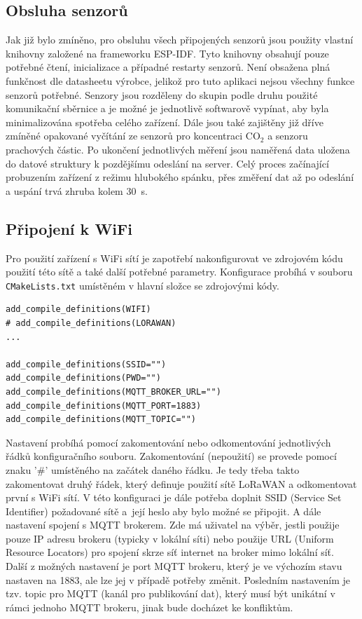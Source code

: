 \subsection{Obsluha senzorů}

Jak již bylo zmíněno, pro obsluhu všech připojených senzorů jsou použity vlastní knihovny založené na frameworku ESP-IDF. Tyto knihovny obsahují pouze potřebné čtení, inicializace a případné restarty senzorů. Není obsažena plná funkčnost dle datasheetu výrobce, jelikož pro tuto aplikaci nejsou všechny funkce senzorů potřebné. Senzory jsou rozděleny do skupin podle druhu použité komunikační sběrnice a je možné je jednotlivě softwarově vypínat, aby byla minimalizována spotřeba celého zařízení. Dále jsou také zajištěny již dříve zmíněné opakované vyčítání ze senzorů pro koncentraci CO$_2$ a senzoru prachových částic. Po ukončení jednotlivých měření jsou naměřená data uložena do datové struktury k pozdějšímu odeslání na server. Celý proces začínající probuzením zařízení z režimu hlubokého spánku, přes změření dat až po odeslání a uspání trvá zhruba kolem \SI{30}{\second}.

\subsection{Připojení k WiFi}

Pro použití zařízení s WiFi sítí je zapotřebí nakonfigurovat ve zdrojovém kódu použití této sítě a také další potřebné parametry. Konfigurace probíhá v souboru \texttt{CMakeLists.txt} umístěném v hlavní složce se zdrojovými kódy.

\begin{lstlisting}[caption={Nastavení spojení pomocí WiFi}]
add_compile_definitions(WIFI)
# add_compile_definitions(LORAWAN)
...

add_compile_definitions(SSID="")
add_compile_definitions(PWD="")
add_compile_definitions(MQTT_BROKER_URL="")
add_compile_definitions(MQTT_PORT=1883)
add_compile_definitions(MQTT_TOPIC="")
\end{lstlisting}

Nastavení probíhá pomocí zakomentování nebo odkomentování jednotlivých řádků konfiguračního souboru. Zakomentování (nepoužití) se provede pomocí znaku '\#' umístěného na začátek daného řádku. Je tedy třeba takto zakomentovat druhý řádek, který definuje použití sítě LoRaWAN a odkomentovat první s WiFi sítí.
V této konfiguraci je dále potřeba doplnit SSID (Service Set Identifier) požadované sítě a~její heslo aby bylo možné se připojit. A dále nastavení spojení s MQTT brokerem. Zde má uživatel na výběr, jestli použije pouze IP adresu brokeru (typicky v lokální síti) nebo použije URL (Uniform Resource Locators) pro spojení skrze síť internet na broker mimo lokální síť. Další z možných nastavení je port MQTT brokeru, který je ve výchozím stavu nastaven na \SI{1883}{}, ale lze jej v případě potřeby změnit. Posledním nastavením je tzv. topic pro MQTT (kanál pro publikování dat), který musí být unikátní v rámci jednoho MQTT brokeru, jinak bude docházet ke konfliktům.

